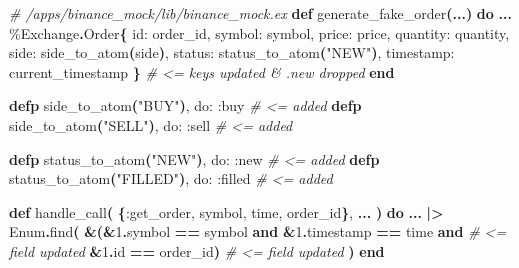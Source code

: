 \documentclass[
  oneside]{book}
\newenvironment{Shaded}{\begin{snugshade}}{\end{snugshade}}
\newcommand{\CommentTok}[1]{\textcolor[rgb]{0.56,0.35,0.01}{\textit{#1}}}
\newcommand{\ConstantTok}[1]{\textcolor[rgb]{0.56,0.35,0.01}{#1}}
\newcommand{\DecValTok}[1]{\textcolor[rgb]{0.00,0.00,0.81}{#1}}
\newcommand{\FunctionTok}[1]{\textcolor[rgb]{0.13,0.29,0.53}{\textbf{#1}}}
\newcommand{\KeywordTok}[1]{\textcolor[rgb]{0.13,0.29,0.53}{\textbf{#1}}}
\newcommand{\NormalTok}[1]{#1}
\newcommand{\OperatorTok}[1]{\textcolor[rgb]{0.81,0.36,0.00}{\textbf{#1}}}
\newcommand{\StringTok}[1]{\textcolor[rgb]{0.31,0.60,0.02}{#1}}
\newcommand{\VariableTok}[1]{\textcolor[rgb]{0.00,0.00,0.00}{#1}}
\begin{document}
\begin{Shaded}
\begin{Highlighting}[]
  \CommentTok{\# /apps/binance\_mock/lib/binance\_mock.ex}
  \KeywordTok{def}\NormalTok{ generate\_fake\_order}\FunctionTok{(}\OperatorTok{...}\FunctionTok{)} \KeywordTok{do}
    \OperatorTok{...}
\NormalTok{    \%}\ConstantTok{Exchange}\OperatorTok{.}\ConstantTok{Order}\FunctionTok{\{}
      \VariableTok{id:}\NormalTok{ order\_id,}
      \VariableTok{symbol:}\NormalTok{ symbol,}
      \VariableTok{price:}\NormalTok{ price,}
      \VariableTok{quantity:}\NormalTok{ quantity,}
      \VariableTok{side:}\NormalTok{ side\_to\_atom}\FunctionTok{(}\NormalTok{side}\FunctionTok{)}\NormalTok{,}
      \VariableTok{status:}\NormalTok{ status\_to\_atom}\FunctionTok{(}\StringTok{"NEW"}\FunctionTok{)}\NormalTok{,}
      \VariableTok{timestamp:}\NormalTok{ current\_timestamp}
    \FunctionTok{\}} \CommentTok{\# \textless{}= keys updated \& \textasciigrave{}.new\textasciigrave{} dropped}
  \KeywordTok{end}

  \KeywordTok{defp}\NormalTok{ side\_to\_atom}\FunctionTok{(}\StringTok{"BUY"}\FunctionTok{)}\NormalTok{, }\VariableTok{do:} \VariableTok{:buy}   \CommentTok{\# \textless{}= added}
  \KeywordTok{defp}\NormalTok{ side\_to\_atom}\FunctionTok{(}\StringTok{"SELL"}\FunctionTok{)}\NormalTok{, }\VariableTok{do:} \VariableTok{:sell} \CommentTok{\# \textless{}= added}

  \KeywordTok{defp}\NormalTok{ status\_to\_atom}\FunctionTok{(}\StringTok{"NEW"}\FunctionTok{)}\NormalTok{, }\VariableTok{do:} \VariableTok{:new}       \CommentTok{\# \textless{}= added}
  \KeywordTok{defp}\NormalTok{ status\_to\_atom}\FunctionTok{(}\StringTok{"FILLED"}\FunctionTok{)}\NormalTok{, }\VariableTok{do:} \VariableTok{:filled} \CommentTok{\# \textless{}= added}

  \KeywordTok{def}\NormalTok{ handle\_call}\FunctionTok{(}
        \FunctionTok{\{}\VariableTok{:get\_order}\NormalTok{, symbol, time, order\_id}\FunctionTok{\}}\NormalTok{,}
        \OperatorTok{...}
  \FunctionTok{)} \KeywordTok{do}
    \OperatorTok{...}
      \OperatorTok{|\textgreater{}} \ConstantTok{Enum}\OperatorTok{.}\NormalTok{find}\FunctionTok{(}
        \OperatorTok{\&}\FunctionTok{(}\OperatorTok{\&}\DecValTok{1}\OperatorTok{.}\NormalTok{symbol }\OperatorTok{==}\NormalTok{ symbol }\KeywordTok{and}
            \OperatorTok{\&}\DecValTok{1}\OperatorTok{.}\NormalTok{timestamp }\OperatorTok{==}\NormalTok{ time }\KeywordTok{and} \CommentTok{\# \textless{}= field updated}
            \OperatorTok{\&}\DecValTok{1}\OperatorTok{.}\NormalTok{id }\OperatorTok{==}\NormalTok{ order\_id}\FunctionTok{)}       \CommentTok{\# \textless{}= field updated}
      \FunctionTok{)}
  \KeywordTok{end}


\end{Highlighting}
\end{Shaded}
\end{document}
